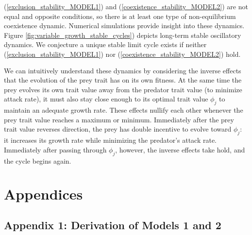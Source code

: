 \documentclass{amsart}
\theoremstyle{definition}
\theoremstyle{remark}
\numberwithin{equation}{section}
\begin{document}
(\ref{exclusion_stability_MODEL1}) and (\ref{coexistence_stability_MODEL2}) are not equal and opposite conditions, so there is at least one type of non-equilibrium coexistence dynamic.  Numerical simulations provide insight into these dynamics.  Figure \ref{fig:variable_growth_stable_cycles}) depicts long-term stable oscillatory dynamics.  We conjecture a unique stable limit cycle exists if neither (\ref{exclusion_stability_MODEL1}) nor (\ref{coexistence_stability_MODEL2}) hold.

We can intuitively understand these dynamics by considering the inverse effects that the evolution of the prey trait has on its own fitness.  At the same time the prey evolves its own trait value away from the predator trait value (to minimize attack rate), it must also stay close enough to its optimal trait value $\phi_j$ to maintain an adequate growth rate.  These effects nullify each other whenever the prey trait value reaches a maximum or minimum.  Immediately after the prey trait value reverses direction, the prey has double incentive to evolve toward $\phi_j$: it increases its growth rate while minimizing the predator's attack rate.  Immediately after passing through $\phi_j$, however, the inverse effects take hold, and the cycle begins again.

\pagebreak
\section{Appendices}
\subsection{Appendix 1: Derivation of Models 1 and 2}
\end{document}
